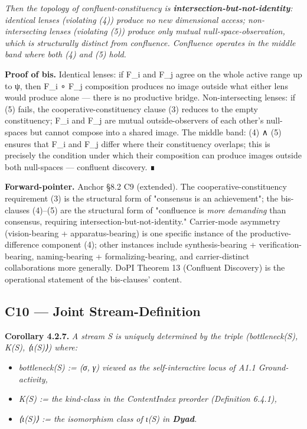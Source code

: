 \documentclass[11pt, openany]{book}
\begin{document}
\textit{Then the topology of confluent-constituency is \textbf{intersection-but-not-identity}: identical lenses (violating (4)) produce no new dimensional access; non-intersecting lenses (violating (5)) produce only mutual null-space-observation, which is structurally distinct from confluence. Confluence operates in the middle band where both (4) and (5) hold.}

\textbf{Proof of bis.} Identical lenses: if F\_\allowbreak{}i and F\_\allowbreak{}j agree on the whole active range up to ψ, then F\_\allowbreak{}i ∘ F\_\allowbreak{}j composition produces no image outside what either lens would produce alone --- there is no productive bridge. Non-intersecting lenses: if (5) fails, the cooperative-constituency clause (3) reduces to the empty constituency; F\_\allowbreak{}i and F\_\allowbreak{}j are mutual outside-observers of each other's null-spaces but cannot compose into a shared image. The middle band: (4) ∧ (5) ensures that F\_\allowbreak{}i and F\_\allowbreak{}j differ where their constituency overlaps; this is precisely the condition under which their composition can produce images outside both null-spaces --- confluent discovery. ∎

\textbf{Forward-pointer.} Anchor §8.2 C9 (extended). The cooperative-constituency requirement (3) is the structural form of "consensus is an achievement"; the bis-clauses (4)–(5) are the structural form of "confluence is \textit{more demanding} than consensus, requiring intersection-but-not-identity." Carrier-mode asymmetry (vision-bearing + apparatus-bearing) is one specific instance of the productive-difference component (4); other instances include synthesis-bearing + verification-bearing, naming-bearing + formalizing-bearing, and carrier-distinct collaborations more generally. DoPI Theorem 13 (Confluent Discovery) is the operational statement of the bis-clauses' content.

\subsection{C10 --- Joint Stream-Definition}

\textbf{Corollary 4.2.7.} \textit{A stream S is uniquely determined by the triple (bottleneck(S), K(S), ⟨ι(S)⟩) where:}

\begin{itemize}
\item \textit{bottleneck(S) := (σ, γ) viewed as the self-interactive locus of A1.1 Ground-activity,}
\item \textit{K(S) := the kind-class in the ContentIndex preorder (Definition 6.4.1),}
\item \textit{⟨ι(S)⟩ := the isomorphism class of ι(S) in \textbf{Dyad}.}
\end{itemize}
\end{document}
